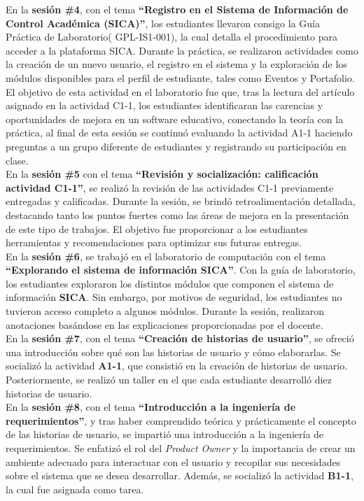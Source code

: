 \documentclass[12pt]{article}
\begin{document}
\begin{multicols}{2}
En la \textbf{sesión \#4},  con el tema \textbf{``Registro en el Sistema de Información de Control Académica (SICA)''}, los estudiantes llevaron consigo la Guía Práctica de Laboratorio( GPL-IS1-001), la cual detalla el procedimiento para acceder a la plataforma SICA. Durante la práctica, se realizaron actividades como la creación de un nuevo usuario, el registro en el sistema y la exploración de los módulos disponibles para el perfil de estudiante, tales como Eventos y Portafolio. El objetivo de esta actividad en el laboratorio fue que, tras la lectura del artículo asignado en la actividad C1-1, los estudiantes identificaran las carencias y oportunidades de mejora en un software educativo, conectando la teoría con la práctica, al final de esta sesión se continuó evaluando la actividad A1-1 haciendo preguntas a un grupo diferente de estudiantes y registrando su participación en clase.\\
En la \textbf{sesión \#5} con el tema \textbf{``Revisión y socialización: calificación actividad C1-1''},  se realizó la revisión de las actividades C1-1 previamente entregadas y calificadas. Durante la sesión, se brindó retroalimentación detallada, destacando tanto los puntos fuertes como las áreas de mejora en la presentación de este tipo de trabajos. El objetivo fue proporcionar a los estudiantes herramientas y recomendaciones para optimizar sus futuras entregas.\\
En la \textbf{sesión \#6}, se trabajó en el laboratorio de computación con el tema \textbf{``Explorando el sistema de información SICA''}. Con la guía de laboratorio, los estudiantes exploraron los distintos módulos que componen el sistema de información \textbf{SICA}. Sin embargo, por motivos de seguridad, los estudiantes no tuvieron acceso completo a algunos módulos. Durante la sesión, realizaron anotaciones basándose en las explicaciones proporcionadas por el docente.\\
En la \textbf{sesión \#7}, con el tema \textbf{``Creación de historias de usuario''}, se ofreció una introducción sobre qué son las historias de usuario y cómo elaborarlas. Se socializó la actividad \textbf{A1-1}, que consistió en la creación de historias de usuario. Posteriormente, se realizó un taller en el que cada estudiante desarrolló diez historias de usuario.\\
En la \textbf{sesión \#8}, con el tema \textbf{``Introducción a la ingeniería de requerimientos''}, y tras haber comprendido teórica y prácticamente el concepto de las historias de usuario, se impartió una introducción a la ingeniería de requerimientos. Se enfatizó el rol del \textit{Product Owner} y la importancia de crear un ambiente adecuado para interactuar con el usuario y recopilar sus necesidades sobre el sistema que se desea desarrollar. Además, se socializó la actividad \textbf{B1-1}, la cual fue asignada como tarea.\\

\end{multicols}
\end{document}
